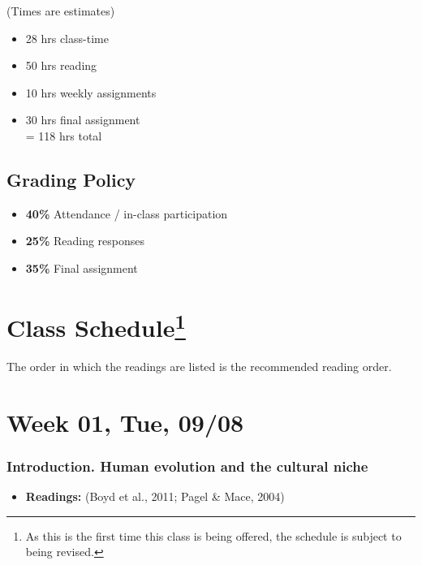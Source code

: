 \documentclass[11pt,man]{article}
\providecommand{\tightlist}{%
  \setlength{\itemsep}{0pt}\setlength{\parskip}{0pt}}
\begin{document}
(Times are estimates)

\begin{itemize}
\tightlist
\item
  28 hrs class-time
\item
  50 hrs reading
\item
  10 hrs weekly assignments
\item
  30 hrs final assignment\\
  = 118 hrs total
\end{itemize}

\hypertarget{grading-policy}{%
\subsection{Grading Policy}\label{grading-policy}}

\begin{itemize}
\tightlist
\item
  \textbf{40\%} Attendance / in-class participation
\item
  \textbf{25\%} Reading responses
\item
  \textbf{35\%} Final assignment
\end{itemize}

\hypertarget{class-schedule1}{%
\section[Class Schedule]{\texorpdfstring{Class
Schedule\footnote{As this is the first time this class is being offered,
  the schedule is subject to being revised.}}{Class Schedule}}\label{class-schedule1}}

The order in which the readings are listed is the recommended reading
order.

\hypertarget{week-01-tue-0908}{%
\section{Week 01, Tue, 09/08}\label{week-01-tue-0908}}

\hypertarget{introduction.-human-evolution-and-the-cultural-niche}{%
\subsubsection{Introduction. Human evolution and the cultural
niche}\label{introduction.-human-evolution-and-the-cultural-niche}}

\begin{itemize}
\tightlist
\item
  \textbf{Readings:} (Boyd et al., 2011; Pagel \& Mace, 2004)
\end{itemize}
\end{document}
